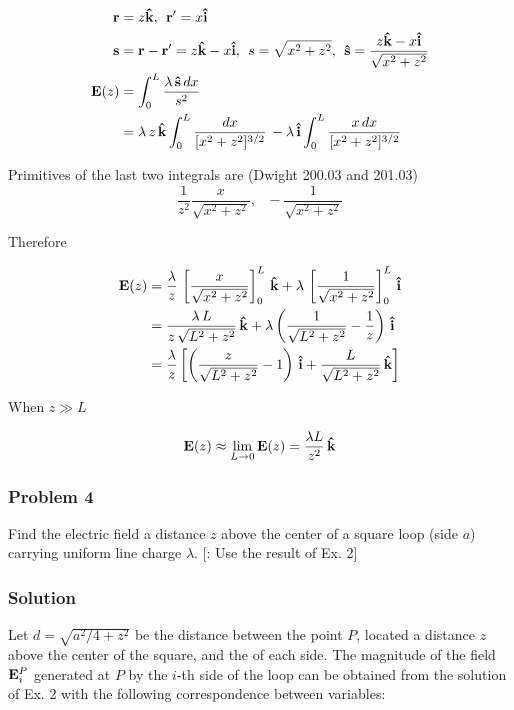 \begin{align*}
\vb{r} &= z \vu{k}, \:\: \vb{r}' = x \vu{i} \\
\vb{s} &= \vb{r} - \vb{r}' = z \vu{k} - x \vu{i}, \:\: s = \sqrt{x^2 + z^2}, \:\: \vu{s} = \frac{z \vu{k} - x \vu{i}}{\sqrt{x^2 + z^2}} \\
\vb{E}(z) &=  \int_0^L \frac{\lambda \, \vu{s} \, dx}{s^2} \\
          &=  \lambda \, z \, \vu{k} \int_0^L \frac{dx}{[x^2 + z^2]^{3/2}} \, - \lambda \, \vu{i} \int_0^L \frac{x \, dx}{[x^2 + z^2]^{3/2}}
\end{align*}

Primitives of the last two integrals are (Dwight 200.03 and 201.03)
$$ \frac{1}{z^2} \frac{x}{\sqrt{x^2 + z^2}}, \:\:\: - \frac{1}{\sqrt{x^2 + z^2}}$$

Therefore

\begin{align*}
\vb{E}(z) &=  \frac{\lambda}{z} \, \left[ \frac{x}{\sqrt{x^2 + z^2}} \right]_0^L  \, \vu{k} +   \lambda \, \left[\frac{1}{\sqrt{x^2 + z^2}}\right]_0^L \, \vu{i} \\
          &= \frac{\lambda\,L}{z\,\sqrt{L^2 + z^2}}\, \vu{k} + \lambda \left(\frac{1}{\sqrt{L^2 + z^2}} - \frac{1}{z}        \right) \, \vu{i} \\
          &= \frac{\lambda}{z} \left[ \left(\frac{z}{\sqrt{L^2 + z^2}} - 1 \right) \, \vu{i} + \frac{L}{\sqrt{L^2 + z^2}}\, \vu{k}  \right] 
\end{align*}

When $z \gg L$ 

$$\vb{E}(z) \approx \lim_{L \rightarrow 0} \vb{E}(z) = \frac{\lambda L}{z^2} \, \vu{k} $$ 

\subsubsection*{Problem 4}
Find the electric field a distance $z$ above the center of a square loop (side $a$) carrying uniform line charge $\lambda$. [: Use the result of Ex. 2]

\subsubsection*{Solution}
Let $d = \sqrt{a^2/4 + z^2}$ be the distance between the point $P$, located a distance $z$ above the center of the square, and the  of each side. The magnitude of the field $\vb{E}_i^P$ generated at $P$ by the $i$-th side of the loop can be obtained from the solution of Ex. 2 with the following correspondence between variables:

